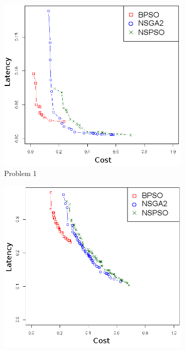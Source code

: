 \begin{figure}[t]
  \caption{NSPSO, NSGA-II and BPSO Experiments: The non-dominated solutions among the set obtained by 40 independent runs}
   \centering
   \begin{subfigure}{0.30\textwidth}
       \includegraphics[width=\textwidth]{pics/nsgabpso1.png}
	   \caption{Problem 1}
   \end{subfigure}
   \begin{subfigure}{0.30\textwidth}
       \includegraphics[width=\textwidth]{pics/nsgabpso2.png}

\end{subfigure}
\end{figure}
